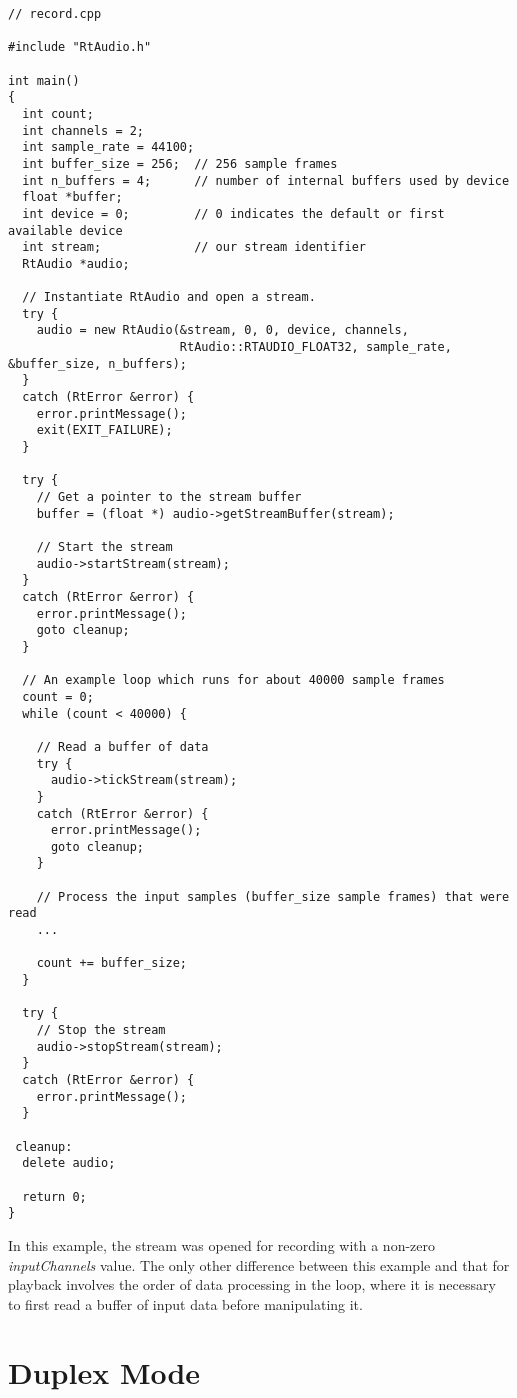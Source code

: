 \footnotesize\begin{verbatim}// record.cpp

#include "RtAudio.h"

int main()
{
  int count;
  int channels = 2;
  int sample_rate = 44100;
  int buffer_size = 256;  // 256 sample frames
  int n_buffers = 4;      // number of internal buffers used by device
  float *buffer;
  int device = 0;         // 0 indicates the default or first available device
  int stream;             // our stream identifier
  RtAudio *audio;

  // Instantiate RtAudio and open a stream.
  try {
    audio = new RtAudio(&stream, 0, 0, device, channels,
                        RtAudio::RTAUDIO_FLOAT32, sample_rate, &buffer_size, n_buffers);
  }
  catch (RtError &error) {
    error.printMessage();
    exit(EXIT_FAILURE);
  }

  try {
    // Get a pointer to the stream buffer
    buffer = (float *) audio->getStreamBuffer(stream);

    // Start the stream
    audio->startStream(stream);
  }
  catch (RtError &error) {
    error.printMessage();
    goto cleanup;
  }

  // An example loop which runs for about 40000 sample frames
  count = 0;
  while (count < 40000) {

    // Read a buffer of data
    try {
      audio->tickStream(stream);
    }
    catch (RtError &error) {
      error.printMessage();
      goto cleanup;
    }

    // Process the input samples (buffer_size sample frames) that were read
    ...

    count += buffer_size;
  }

  try {
    // Stop the stream
    audio->stopStream(stream);
  }
  catch (RtError &error) {
    error.printMessage();
  }

 cleanup:
  delete audio;

  return 0;
}\end{verbatim}\normalsize 


In this example, the stream was opened for recording with a non-zero {\em input\-Channels} value. The only other difference between this example and that for playback involves the order of data processing in the loop, where it is necessary to first read a buffer of input data before manipulating it.

\section{Duplex Mode}\label{duplex}


